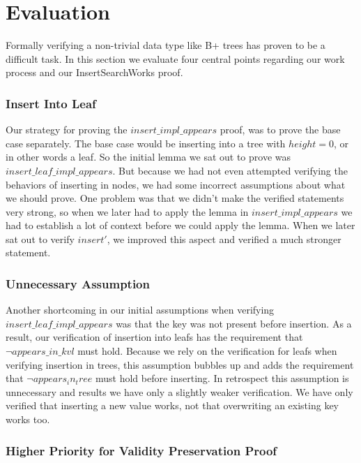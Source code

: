 \section{Evaluation}
\label{sec:Evaluation}
Formally verifying a non-trivial data type like B+ trees has proven to be a difficult task. In this section we evaluate four central points regarding our work process and our InsertSearchWorks proof.

\subsubsection{Insert Into Leaf}
Our strategy for proving the $insert\_impl\_appears$ proof, was to prove the base case separately. The base case would be inserting into a tree with $height = 0$, or in other words a leaf. So the initial lemma we sat out to prove was $insert\_leaf\_impl\_appears$. But because we had not even attempted verifying the behaviors of inserting in nodes, we had some incorrect assumptions about what we should prove. One problem was that we didn't make the verified statements very strong, so when we later had to apply the lemma in $insert\_impl\_appears$ we had to establish a lot of context before we could apply the lemma. When we later sat out to verify $insert'$, we improved this aspect and verified a much stronger statement.

\subsubsection{Unnecessary Assumption}

Another shortcoming in our initial assumptions when verifying $insert\_leaf\_impl\_appears$ was that the key was not present before insertion. As a result, our verification of insertion into leafs has the requirement that $\lnot appears\_in\_kvl$ must hold. Because we rely on the verification for leafs when verifying insertion in trees, this assumption bubbles up and adds the requirement that $\lnot appears_in_tree$ must hold before inserting. In retrospect this assumption is unnecessary and results we have only a slightly weaker verification. We have only verified that inserting a new value works, not that overwriting an existing key works too. 

\subsubsection{Higher Priority for Validity Preservation Proof}

